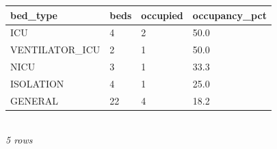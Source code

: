 {\scriptsize\setlength{\tabcolsep}{2.5pt}\begin{tabular}{llll}\toprule
\textbf{bed\_type} & \textbf{beds} & \textbf{occupied} & \textbf{occupancy\_pct} \\\midrule
ICU & 4 & 2 & 50.0 \\
VENTILATOR\_ICU & 2 & 1 & 50.0 \\
NICU & 3 & 1 & 33.3 \\
ISOLATION & 4 & 1 & 25.0 \\
GENERAL & 22 & 4 & 18.2 \\
\bottomrule\end{tabular}}\\[-1pt]{\tiny\itshape 5 rows}
